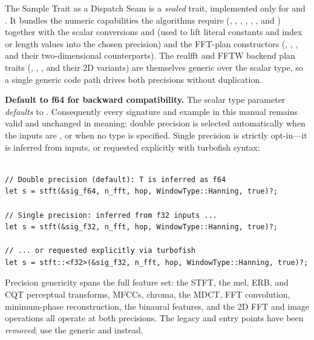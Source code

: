 \begin{concept}{The Sample Trait as a Dispatch Seam}
   is a \emph{sealed} trait, implemented only for
   and . It bundles the numeric capabilities the
  algorithms require (, , ,
  , , , and ) together
  with the scalar conversions  and 
  (used to lift literal constants and index or length values into the
  chosen precision) and the FFT-plan constructors (,
    , , and their two-dimensional
  counterparts). The realfft and FFTW backend plan traits
  (, , , and their 2D
  variants) are themselves generic over the scalar type, so a single
  generic code path drives both precisions without duplication.
\end{concept}

\textbf{Default to f64 for backward compatibility.} The scalar type
parameter \emph{defaults} to . Consequently every 
signature and example in this manual remains valid and unchanged in
meaning: double precision is selected automatically when the inputs are
, or when no type is specified. Single precision is strictly
opt-in---it is inferred from  inputs, or requested explicitly
with turbofish syntax:

\begin{lstlisting}[caption={The same call at the default (f64) and at f32}]

// Double precision (default): T is inferred as f64
let s = stft(&sig_f64, n_fft, hop, WindowType::Hanning, true)?;

// Single precision: inferred from f32 inputs ...
let s = stft(&sig_f32, n_fft, hop, WindowType::Hanning, true)?;

// ... or requested explicitly via turbofish
let s = stft::<f32>(&sig_f32, n_fft, hop, WindowType::Hanning, true)?;
\end{lstlisting}

Precision genericity spans the full feature set: the STFT, the mel,
ERB, and CQT perceptual transforms, MFCCs, chroma, the MDCT, FFT
convolution, minimum-phase reconstruction, the binaural features, and
the 2D FFT and image operations all operate at both precisions. The
legacy  and  entry points have been
\emph{removed}; use the generic  and
 instead.

